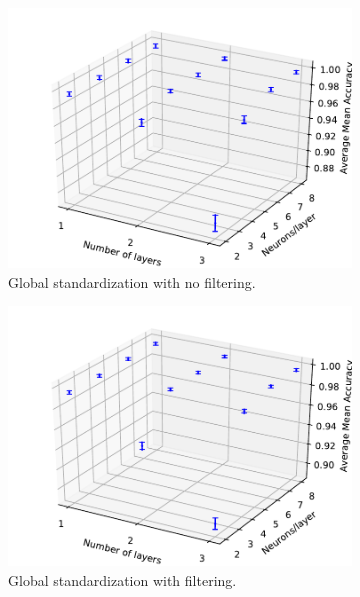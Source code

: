 \documentclass[paper=a4, fontsize=11pt]{scrartcl} %
\begin{document}
\begin{figure}[H]
		\begin{subfigure}{0.5\linewidth}
			\centering
			\includegraphics[width=\linewidth]{../output/EN/figures/en_architecture_global_standard_941_486_N10.pdf}
            \caption{Global standardization with no filtering.}
		\end{subfigure}
		\begin{subfigure}{0.5\linewidth}
			\centering
			\includegraphics[width=\linewidth]{../output/EN/figures/en_architecture_global_standard_941_486_feature_pearson_90_N10.pdf}
			\caption{Global standardization with filtering.}
		\end{subfigure}
		\begin{subfigure}{0.5\linewidth}

\end{subfigure}
\end{figure}
\end{document}
